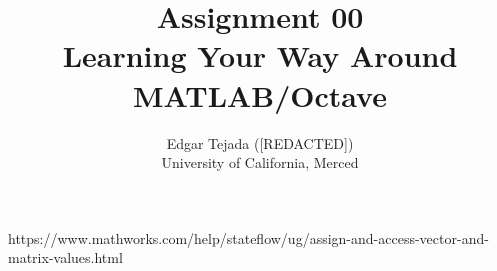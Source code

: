 \documentclass [12pt]{article}
\title{Assignment 00 \\\medskip Learning Your Way Around MATLAB/Octave}
\author{Edgar Tejada ([REDACTED])\\University of California, Merced}
\begin{document}
\maketitle


https://www.mathworks.com/help/stateflow/ug/assign-and-access-vector-and-matrix-values.html

\nocite{*} %
\printbibliography
\end{document}
